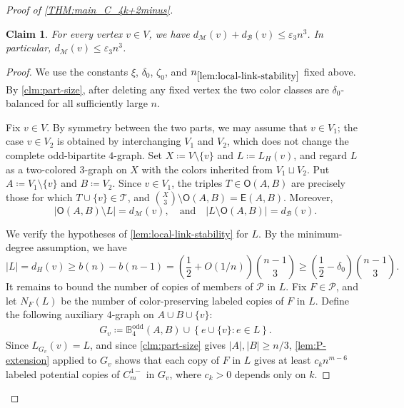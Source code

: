 \documentclass[10pt,a4paper]{article}
\theoremstyle{plain}
\newtheorem{claim}[claim]{Claim}
\theoremstyle{definition}
\begin{document}
\begin{proof}[Proof of \cref{THM:main_C_4k+2minus}]
\begin{claim}\label{clm:vertex-missing}
For every vertex $v\in V$, we have $d_{\mathcal M}(v)+d_{\mathcal B}(v)\le \varepsilon_3n^3$. 
In particular, $d_{\mathcal M}(v)\le \varepsilon_3n^3$.
\end{claim}

\begin{proof}
We use the constants $\xi$, $\delta_0$, $\zeta_0$, and $n_{\ref{lem:local-link-stability}}$ fixed above. By \cref{clm:part-size}, after deleting any fixed vertex the two color classes are $\delta_0$-balanced for all sufficiently large $n$.

Fix $v\in V$. By symmetry between the two parts, we may assume that $v\in V_1$; the case $v\in V_2$ is obtained by interchanging $V_1$ and $V_2$, which does not change the complete odd-bipartite $4$-graph. Set $X\coloneqq V\setminus\{v\}$ and $L\coloneqq L_H(v)$, and regard $L$ as a two-colored $3$-graph on $X$ with the colors inherited from $V_1\sqcup V_2$. Put $A\coloneqq V_1\setminus\{v\}$ and $B\coloneqq V_2$. 
Since $v\in V_1$, the triples $T\in\mathsf O(A,B)$ are precisely those for which $T\cup\{v\}\in\mathcal T$, and $\binom X3\setminus\mathsf O(A,B)=\mathsf E(A,B)$. Moreover,
\begin{equation}\label{eq:V1}
\left|\mathsf O(A,B)\setminus L\right|=d_{\mathcal M}(v),
\quad\text{and}\quad 
\left|L\setminus\mathsf O(A,B)\right|=d_{\mathcal B}(v).
\end{equation}

We verify the hypotheses of \cref{lem:local-link-stability} for $L$. By the minimum-degree assumption, we have 
\[
|L|=d_H(v)\ge b(n)-b(n-1)
=\left(\frac12+O(1/n)\right)\binom{n-1}{3}
\ge \left(\frac12-\delta_0\right)\binom{n-1}{3}.
\]
It remains to bound the number of copies of members of $\mathcal P$ in $L$. Fix $F\in\mathcal P$, and let $N_F(L)$ be the number of color-preserving labeled copies of $F$ in $L$. Define the following auxiliary $4$-graph on $A\cup B\cup\{v\}$: 
\begin{align*}
    G_v\coloneqq\mathbb{B}_4^{\mathrm{odd}}(A,B)\cup\left\{ e \cup \{v\} \colon e \in L\right\}. 
\end{align*}
Since $L_{G_v}(v)=L$, and since \cref{clm:part-size} gives $|A|,|B|\ge n/3$, \cref{lem:P-extension} applied to $G_v$ shows that each copy of $F$ in $L$ gives at least $c_k n^{m-6}$ labeled potential copies of $C_m^{4-}$ in $G_v$, where $c_k>0$ depends only on $k$.


\end{proof}
\end{proof}
\end{document}
